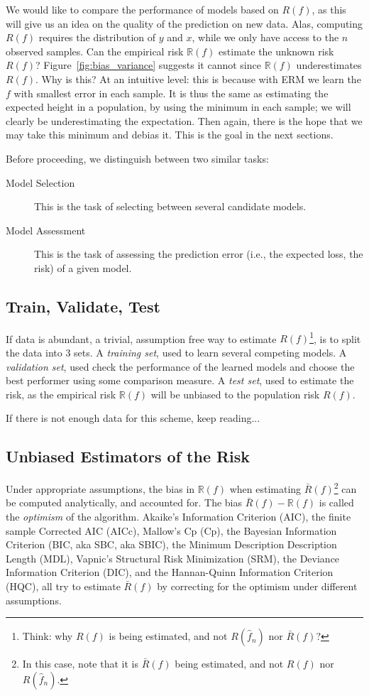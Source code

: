 \documentclass[12pt,a4paper]{article}
\theoremstyle{plain}
\theoremstyle{definition}
\newcommand{\risk}{R}
\newcommand{\riskn}{\mathbb{R}}
\newcommand{\hyp}{f}
\newcommand{\test}{\risk(\hyp)}
\newcommand{\train}{\riskn(\hyp)}
\newcommand{\insample}{\bar{\risk}(\hyp)}
\newcommand{\EPE}{\risk(\hat{\hyp}_n)}
\begin{document}
We would like to compare the performance of models based on $\test$, as this will give us an idea on the quality of the prediction on new data. 
Alas, computing $\test$ requires the distribution of $y$ and $x$, while we only have access to the $n$ observed samples.
Can the empirical risk $\train$ estimate the unknown risk $\test$? 
Figure~\ref{fig:bias_variance} suggests it cannot since $\train$ underestimates $\test$.
Why is this?
At an intuitive level: this is because with ERM we learn the $\hyp$ with smallest error in each sample.
It is thus the same as estimating the expected height in a population, by using the minimum in each sample; we will clearly be underestimating the expectation. Then again, there is the hope that we may take this minimum and debias it. 
This is the goal in the next sections.

Before proceeding, we distinguish between two similar tasks: 
\begin{description}
\item[Model Selection] This is the task of selecting between several candidate models.
\item[Model Assessment] This is the task of assessing the prediction error (i.e., the expected loss, the risk) of a given model.
\end{description}



\subsection{Train, Validate, Test}
\label{sec:train_test}
If data is abundant, a trivial, assumption free way to estimate $\test$\footnote{Think: why $\test$ is being estimated, and not $\EPE$ nor $\insample$?}, is to split the data into $3$ sets.
A \emph{training set}, used to learn several competing models.
A \emph{validation set}, used check the performance of the learned models and choose the best performer using some comparison measure. 
A \emph{test set}, used to estimate the risk, as the empirical risk $\train$ will be unbiased to the population risk $\test$.

If there is not enough data for this scheme, keep reading...


\subsection{Unbiased Estimators of the Risk}
\label{sec:risk_estimation}
Under appropriate assumptions, the bias in $\train$ when estimating $\insample$\footnote{In this case, note that it is $\insample$ being estimated, and not $\test$ nor $\EPE$.} can be computed analytically, and accounted for.
The bias $\insample-\train$ is called the \emph{optimism} of the algorithm.
Akaike's Information Criterion (AIC), 
the finite sample Corrected AIC (AICc), 
Mallow's Cp (Cp), 
the Bayesian Information Criterion (BIC, aka SBC, aka SBIC), 
the Minimum Description Description Length (MDL), 
Vapnic's Structural Risk Minimization (SRM), 
the Deviance Information Criterion (DIC), 
and the Hannan-Quinn Information Criterion (HQC), 
all try to estimate $\insample$ by correcting for the optimism under different assumptions.
\end{document}
